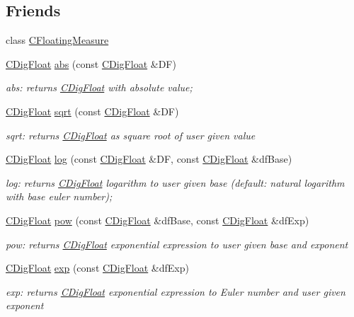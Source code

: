 \subsection*{Friends}
\begin{DoxyCompactItemize}
\item 
class \hyperlink{classCDigFloat_a7e23751869edf87edc0feeb80eda78d9}{C\+Floating\+Measure}
\item 
\hyperlink{classCDigFloat}{C\+Dig\+Float} \hyperlink{classCDigFloat_a269b310d675c311c6e0894bf326593ae}{abs} (const \hyperlink{classCDigFloat}{C\+Dig\+Float} \&DF)
\begin{DoxyCompactList}\small\item\em abs\+: returns \hyperlink{classCDigFloat}{C\+Dig\+Float} with absolute value; \end{DoxyCompactList}\item 
\hyperlink{classCDigFloat}{C\+Dig\+Float} \hyperlink{classCDigFloat_ae66acb4f3bea83a9fad22cc58fe50905}{sqrt} (const \hyperlink{classCDigFloat}{C\+Dig\+Float} \&DF)
\begin{DoxyCompactList}\small\item\em sqrt\+: returns \hyperlink{classCDigFloat}{C\+Dig\+Float} as square root of user given value \end{DoxyCompactList}\item 
\hyperlink{classCDigFloat}{C\+Dig\+Float} \hyperlink{classCDigFloat_a25031604af1e6356848a9ac84c209903}{log} (const \hyperlink{classCDigFloat}{C\+Dig\+Float} \&DF, const \hyperlink{classCDigFloat}{C\+Dig\+Float} \&df\+Base)
\begin{DoxyCompactList}\small\item\em log\+: returns \hyperlink{classCDigFloat}{C\+Dig\+Float} logarithm to user given base (default\+: natural logarithm with base euler number); \end{DoxyCompactList}\item 
\hyperlink{classCDigFloat}{C\+Dig\+Float} \hyperlink{classCDigFloat_ac5877d13039d236858e1cb04351f0a86}{pow} (const \hyperlink{classCDigFloat}{C\+Dig\+Float} \&df\+Base, const \hyperlink{classCDigFloat}{C\+Dig\+Float} \&df\+Exp)
\begin{DoxyCompactList}\small\item\em pow\+: returns \hyperlink{classCDigFloat}{C\+Dig\+Float} exponential expression to user given base and exponent \end{DoxyCompactList}\item 
\hyperlink{classCDigFloat}{C\+Dig\+Float} \hyperlink{classCDigFloat_a2206715f4b83afeea6339373bb3631fb}{exp} (const \hyperlink{classCDigFloat}{C\+Dig\+Float} \&df\+Exp)
\begin{DoxyCompactList}\small\item\em exp\+: returns \hyperlink{classCDigFloat}{C\+Dig\+Float} exponential expression to Euler number and user given exponent \end{DoxyCompactList}\end{DoxyCompactItemize}


